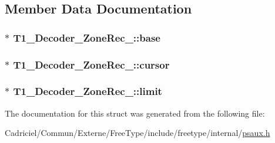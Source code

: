 \subsection{Member Data Documentation}
\hypertarget{struct_t1___decoder___zone_rec___a9cd7e54387b238504b1e8aae47b7da7c}{
\subsubsection[{base}]{$\ast$ T1\-\_\-\-Decoder\-\_\-\-Zone\-Rec\-\_\-\-::base}}\label{struct_t1___decoder___zone_rec___a9cd7e54387b238504b1e8aae47b7da7c}
\hypertarget{struct_t1___decoder___zone_rec___a14e9f190496672f6174ead91e375767d}{
\subsubsection[{cursor}]{$\ast$ T1\-\_\-\-Decoder\-\_\-\-Zone\-Rec\-\_\-\-::cursor}}\label{struct_t1___decoder___zone_rec___a14e9f190496672f6174ead91e375767d}
\hypertarget{struct_t1___decoder___zone_rec___a46fe1e4aa9bdb712ae414305f88d95db}{
\subsubsection[{limit}]{$\ast$ T1\-\_\-\-Decoder\-\_\-\-Zone\-Rec\-\_\-\-::limit}}\label{struct_t1___decoder___zone_rec___a46fe1e4aa9bdb712ae414305f88d95db}


The documentation for this struct was generated from the following file\-:\begin{DoxyCompactItemize}
\item 
Cadriciel/\-Commun/\-Externe/\-Free\-Type/include/freetype/internal/\hyperlink{psaux_8h}{psaux.\-h}\end{DoxyCompactItemize}
